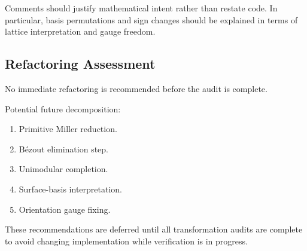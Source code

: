 Comments should justify mathematical intent rather than restate code.
In particular, basis permutations and sign changes should be explained in
terms of lattice interpretation and gauge freedom.

\subsection{Refactoring Assessment}

No immediate refactoring is recommended before the audit is complete.

Potential future decomposition:

\begin{enumerate}
\item Primitive Miller reduction.
\item Bézout elimination step.
\item Unimodular completion.
\item Surface-basis interpretation.
\item Orientation gauge fixing.
\end{enumerate}

These recommendations are deferred until all transformation audits are
complete to avoid changing implementation while verification is in
progress.
